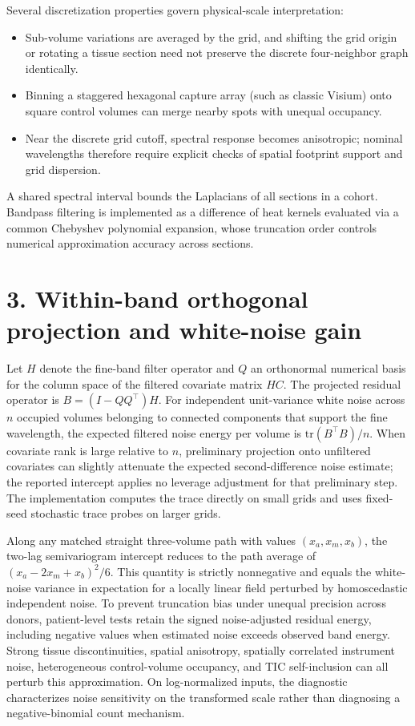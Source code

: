 \documentclass[11pt]{article}
\begin{document}
Several discretization properties govern physical-scale interpretation:
\begin{itemize}
\item Sub-volume variations are averaged by the grid, and shifting the grid origin or rotating a tissue section need not preserve the discrete four-neighbor graph identically.
\item Binning a staggered hexagonal capture array (such as classic Visium) onto square control volumes can merge nearby spots with unequal occupancy.
\item Near the discrete grid cutoff, spectral response becomes anisotropic; nominal wavelengths therefore require explicit checks of spatial footprint support and grid dispersion.
\end{itemize}
A shared spectral interval bounds the Laplacians of all sections in a cohort. Bandpass filtering is implemented as a difference of heat kernels evaluated via a common Chebyshev polynomial expansion, whose truncation order controls numerical approximation accuracy across sections.

\section*{3. Within-band orthogonal projection and white-noise gain}
Let $H$ denote the fine-band filter operator and $Q$ an orthonormal numerical basis for the column space of the filtered covariate matrix $HC$. The projected residual operator is $B = (I - QQ^\top)H$. For independent unit-variance white noise across $n$ occupied volumes belonging to connected components that support the fine wavelength, the expected filtered noise energy per volume is $\mathrm{tr}(B^\top B)/n$. When covariate rank is large relative to $n$, preliminary projection onto unfiltered covariates can slightly attenuate the expected second-difference noise estimate; the reported intercept applies no leverage adjustment for that preliminary step. The implementation computes the trace directly on small grids and uses fixed-seed stochastic trace probes on larger grids.

Along any matched straight three-volume path with values $(x_a, x_m, x_b)$, the two-lag semivariogram intercept reduces to the path average of $(x_a - 2x_m + x_b)^2 / 6$. This quantity is strictly nonnegative and equals the white-noise variance in expectation for a locally linear field perturbed by homoscedastic independent noise. To prevent truncation bias under unequal precision across donors, patient-level tests retain the signed noise-adjusted residual energy, including negative values when estimated noise exceeds observed band energy. Strong tissue discontinuities, spatial anisotropy, spatially correlated instrument noise, heterogeneous control-volume occupancy, and TIC self-inclusion can all perturb this approximation. On log-normalized inputs, the diagnostic characterizes noise sensitivity on the transformed scale rather than diagnosing a negative-binomial count mechanism.
\end{document}
